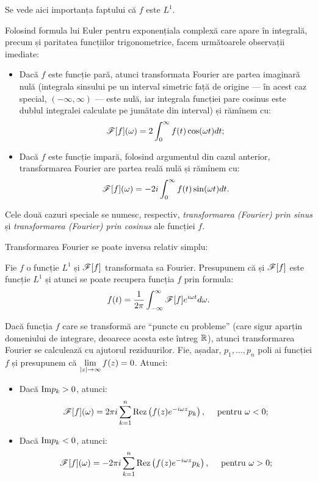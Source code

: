 
Se vede aici importanța faptului că $ f $ este $ L^1 $.

Folosind formula lui Euler pentru exponențiala complexă care apare în
integrală, precum și paritatea funcțiilor trigonometrice, facem următoarele
observații imediate:
\begin{itemize}
\item Dacă $ f $ este funcție pară, atunci transformata Fourier are partea
  imaginară nulă (integrala sinsului pe un interval simetric față de origine ---
  în acest caz special, $ (-\infty, \infty) $ --- este nulă, iar integrala
  funcției pare cosinus este dublul integralei calculate pe jumătate din
  interval) și rămînem cu:
  \[
    \mathscr{F}[f](\omega) = 2 \int_0^\infty f(t)\cos(\omega t) dt;
  \]
\item Dacă $ f $ este funcție impară, folosind argumentul din cazul anterior,
  transformarea Fourier are partea reală nulă și rămînem cu:
  \[
    \mathscr{F}[f](\omega) = -2i \int_0^\infty f(t) \sin (\omega t) dt.
  \]
\end{itemize}

Cele două cazuri speciale se numesc, respectiv, \emph{transformarea (Fourier) prin sinus}
și \emph{transformarea (Fourier) prin cosinus} ale funcției $ f $.

Transformarea Fourier se poate inversa relativ simplu:
\begin{theorem}\label{thm:fourier-inv}
  Fie $ f $ o funcție $ L^1 $ și $ \mathscr{F}[f] $ transformata sa Fourier.
  Presupunem că și $ \mathscr{F}[f] $ este funcție $ L^1 $ și atunci
  se poate recupera funcția $ f $ prin formula:
  \[
    f(t) = \dfrac{1}{2 \pi} \int_{-\infty}^\infty \mathscr{F}[f]e^{i\omega t}d\omega.
  \]
\end{theorem}

Dacă funcția $ f $ care se transformă are \enquote{puncte cu probleme}
(care sigur aparțin domeniului de integrare, deoarece acesta este întreg
$ \mathbb{R} $), atunci transformarea Fourier se calculează cu ajutorul reziduurilor.
Fie, așadar, $ p_1, \dots, p_n $ poli ai funcției $ f $ și presupunem că
$ \displaystyle\lim_{|z| \to \infty} f(z) = 0 $. Atunci:
\begin{itemize}
\item Dacă $ \mathrm{Im}p_k > 0 $, atunci:
  \[
    \kal{F}[f](\omega) = 2\pi i \sum_{k=1}^n \dr{Rez}\left(f(z)e^{-i\omega z} p_k\right), %
    \quad \text{ pentru } \omega < 0;
  \]
\item Dacă $ \mathrm{Im}p_k < 0 $, atunci:
  \[
    \kal{F}[f](\omega) = -2\pi i \sum_{k=1}^n \dr{Rez}\left(f(z)e^{-i\omega z} p_k\right), %
    \quad \text{ pentru } \omega > 0;
  \]
\end{itemize}

